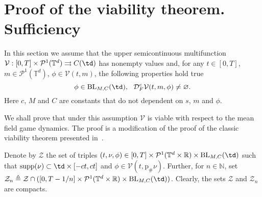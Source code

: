 \documentclass[a4paper,12pt]{article}
\newcommand{\tdr}{\mathbb{T}^{d}\times\mathbb{R}}
\newcommand{\ptd}{\mathcal{P}^1(\mathbb{T}^d)}
\begin{document}
\section{Proof of the viability theorem. Sufficiency}\label{sect:proof_sufficiency}
In this section we assume that the upper semicontinuous multifunction $\mathcal{V}:[0,T]\times \ptd\rightrightarrows C(\td)$ has nonempty values and, for any $t\in [0,T]$, $m\in \ptd$, $\phi\in\mathcal{V}(t,m)$, the following properties hold true $$\phi \in\mathrm{BL}_{M,C}(\td), \ \ \mathcal{D}^c_F\mathcal{V}(t,m,\phi)\neq \varnothing.$$ Here $c$, $M$ and $C$ are constants that do not dependent on $s$, $m$ and $\phi$. %

We shall prove that under this assumption $\mathcal{V}$ is viable with respect to the mean field game dynamics.
The proof is a modification of the proof of the classic viability theorem presented in~\cite{Aubin}.

Denote by $\mathcal{Z}$ the set of triples $(t,\nu,\phi)\in [0,T]\times\mathcal{P}^1(\tdr)\times \mathrm{BL}_{M,C}(\td)$ such that $\mathrm{supp}(\nu)\subset \td\times [-ct,ct]$ and $\phi\in\mathcal{V}(t,\mathrm{p}_\#\nu)$. Further, for $n\in\mathbb{N}$, set $\mathcal{Z}_n\triangleq \mathcal{Z}\cap ([0,T-1/n]\times\mathcal{P}^1(\tdr)\times \mathrm{BL}_{M,C}(\td))$. Clearly, the sets $\mathcal{Z}$ and $\mathcal{Z}_n$ are compacts.
\end{document}
